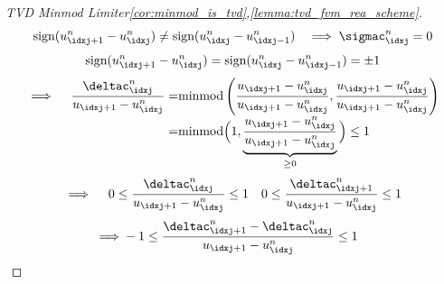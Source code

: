 \begin{proofbox}\nospacing
    \begin{proof}[TVD Minmod Limiter\cref{cor:minmod_is_tvd},\cref{lemma:tvd_fvm_rea_scheme}]\label{proof:tvd_minmod_limiter}\leavevmode\\
      \begin{align*}
        \text{sign}(u_{\idxj+1}^{n}-u_{\idxj}^{n})\neq\text{sign}(u_{\idxj}^{n}-u_{\idxj-1}^{n})&&\implies\sigmac_{\idxj}^{n}=0
      \end{align*}
      \begin{align*}
        \text{sign}(u_{\idxj+1}^{n}-u_{\idxj}^{n})=\text{sign}(u_{\idxj}^{n}-u_{\idxj-1}^{n})=\pm1
      \end{align*}
      \begin{align*}
        \implies\quad\frac{\deltac_{\idxj}^{n}}{u_{\idxj+1}-u_{\idxj}^{n}}=&\text{minmod}\left(\frac{{u_{\idxj+1}-u_{\idxj}^{n}}}{u_{\idxj+1}-u_{\idxj}^{n}},\frac{{u_{\idxj+1}-u_{\idxj}^{n}}}{u_{\idxj+1}-u_{\idxj}^{n}}\right)\\[-1\jot]
        =&\text{minmod}\Big(1,\underbrace{\frac{{u_{\idxj+1}-u_{\idxj}^{n}}}{u_{\idxj+1}-u_{\idxj}^{n}}}_{\geq0}\Big)\leq 1
      \end{align*}
      \begin{align*}
        \implies\quad 0\leq\frac{\deltac_{\idxj}^{n}}{u_{\idxj+1}-u_{\idxj}^{n}}\leq 1&&0\leq\frac{\deltac_{\idxj+1}^{n}}{u_{\idxj+1}-u_{\idxj}^{n}}\leq 1
      \end{align*}
      \begin{align}
        \implies&-1\leq\frac{\deltac_{\idxj+1}^{n}-\deltac_{\idxj}^{n}}{u_{\idxj+1}-u_{\idxj}^{n}}\leq 1
      \end{align}
    \end{proof}
\end{proofbox}

